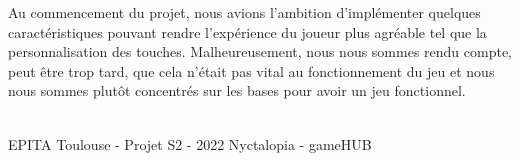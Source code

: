 \vspace*{7mm}
\par
Au commencement du projet, nous avions l'ambition d'implémenter quelques caractéristiques pouvant rendre l'expérience du joueur plus agréable tel que la personnalisation des touches. Malheureusement, nous nous sommes rendu compte, peut être trop tard, que cela n'était pas vital au fonctionnement du jeu et nous nous sommes plutôt concentrés sur les bases pour avoir un jeu fonctionnel.

\vfill
\noindent\makebox[\linewidth]{\rule{.8\paperwidth}{.6pt}}\\[0.2cm]
EPITA Toulouse - Projet S2 - 2022 \hfill Nyctalopia - gameHUB
\noindent\makebox[\linewidth]{\rule{.8\paperwidth}{.6pt}}